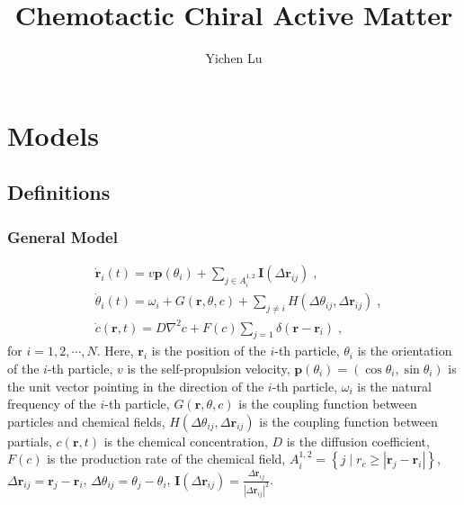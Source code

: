 \documentclass{article}
\title{\textbf{Chemotactic Chiral Active Matter}}
\author{Yichen Lu}
\begin{document}
\maketitle

\tableofcontents

\newpage
\section{Models}
\subsection{Definitions}
\subsubsection{General Model}
\begin{subequations}
    \begin{align}
        &\dot{\mathbf{r}}_i\left( t \right) =v\mathbf{p}\left( \theta _i \right) +\sum_{j\in A_{i}^{1,2}}{\mathbf{I}\left( \Delta \mathbf{r}_{ij} \right)}\;,\\
        &\dot{\theta}_i\left( t \right) =\omega _i+G\left( \mathbf{r},\theta ,c \right) +\sum_{j\ne i}{H\left( \Delta \theta _{ij},\Delta \mathbf{r}_{ij} \right)}\;,\\
        &\dot{c}\left( \mathbf{r},t \right) =D\nabla ^2c+F\left( c \right) \sum_{j=1}{\delta \left( \mathbf{r}-\mathbf{r}_i \right)}\;,
    \end{align}
\end{subequations}
for $i=1,2,\cdots,N$. Here, $\mathbf{r}_i$ is the position of the $i$-th particle, $\theta _i$ is the orientation of the $i$-th particle, $v$ is the self-propulsion velocity, $\mathbf{p}\left( \theta _i \right)=\left( \cos \theta _i,\sin \theta _i \right)$ is the unit vector pointing in the direction of the $i$-th particle, $\omega _i$ is the natural frequency of the $i$-th particle, $G\left( \mathbf{r},\theta ,c \right)$ is the coupling function between particles and chemical fields, $H\left( \Delta \theta _{ij},\Delta \mathbf{r}_{ij} \right)$ is the coupling function between partials, $c\left( \mathbf{r},t \right)$ is the chemical concentration, $D$ is the diffusion coefficient, $F\left( c \right)$ is the production rate of the chemical field, $A_{i}^{1,2}=\left\{ j\mid r_c\geqslant | \mathbf{r}_j-\mathbf{r}_i | \right\}$, $\Delta \mathbf{r}_{ij}=\mathbf{r}_j-\mathbf{r}_i$, $\Delta \theta _{ij}=\theta _j-\theta _i$, $\mathbf{I}\left( \Delta \mathbf{r}_{ij} \right)=\frac{\Delta \mathbf{r}_{ij}}{|\Delta \mathbf{r}_{ij}|^{2}}$.
\end{document}
